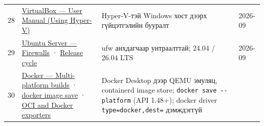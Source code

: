 \begin{longtable}[]{@{}llll@{}}
\begin{minipage}[t]{0.22\columnwidth}\raggedright
28\strut
\end{minipage} & \begin{minipage}[t]{0.22\columnwidth}\raggedright
\href{https://www.virtualbox.org/manual/UserManual.html}{VirtualBox --- User Manual (Using Hyper-V)}\strut
\end{minipage} & \begin{minipage}[t]{0.22\columnwidth}\raggedright
Hyper-V-тэй Windows хост дээрх гүйцэтгэлийн бууралт\strut
\end{minipage} & \begin{minipage}[t]{0.22\columnwidth}\raggedright
2026-09\strut
\end{minipage}\tabularnewline
\begin{minipage}[t]{0.22\columnwidth}\raggedright
29\strut
\end{minipage} & \begin{minipage}[t]{0.22\columnwidth}\raggedright
\href{https://ubuntu.com/server/docs/how-to/security/firewalls/}{Ubuntu Server --- Firewalls} · \href{https://ubuntu.com/about/release-cycle}{Release cycle}\strut
\end{minipage} & \begin{minipage}[t]{0.22\columnwidth}\raggedright
ufw анхдагчаар унтраалттай; 24.04 / 26.04 LTS\strut
\end{minipage} & \begin{minipage}[t]{0.22\columnwidth}\raggedright
2026-09\strut
\end{minipage}\tabularnewline
\begin{minipage}[t]{0.22\columnwidth}\raggedright
30\strut
\end{minipage} & \begin{minipage}[t]{0.22\columnwidth}\raggedright
\href{https://docs.docker.com/build/building/multi-platform/}{Docker --- Multi-platform builds} · \href{https://docs.docker.com/reference/cli/docker/image/save/}{docker image save} · \href{https://docs.docker.com/build/exporters/oci-docker/}{OCI and Docker exporters}\strut
\end{minipage} & \begin{minipage}[t]{0.22\columnwidth}\raggedright
Docker Desktop дээр QEMU эмуляц, containerd image store; \texttt{docker\ save\ -\/\allowbreak{}-platform} (API 1.48+); docker driver \texttt{type=\allowbreak{}docker,dest=\allowbreak{}} дэмждэггүй\strut
\end{minipage} & \begin{minipage}[t]{0.22\columnwidth}\raggedright

\end{minipage}
\end{longtable}
